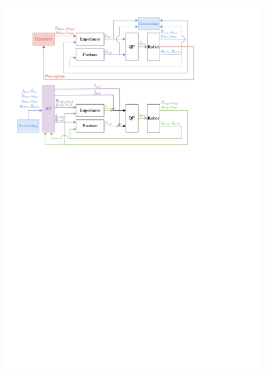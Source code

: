 \documentclass[a4paper, 10pt, conference]{ieeeconf}
\begin{document}
     \begin{figure}[h]
      \centering

    \includegraphics[trim={1cm 23.3cm 5cm 1cm}, clip]{Graphics/qp.pdf}

\end{figure}
\end{document}
